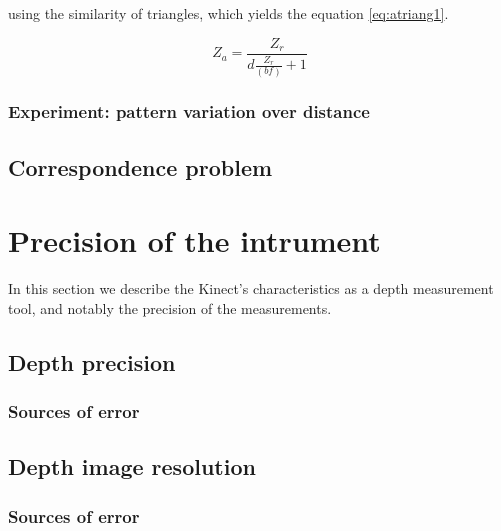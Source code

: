 using the similarity of triangles, which yields the equation \ref{eq:atriang1}.

\begin{equation} \label{eq:atriang1}
    Z_a = \frac{Z_r}{d \frac{Z_r}{(b f)} + 1}
\end{equation}


\subsubsection{Experiment: pattern variation over distance}



\subsection{Correspondence problem}
\label{sub:corr}



\section{Precision of the intrument}
\label{precision}

In this section we describe the Kinect's characteristics as a depth measurement
tool, and notably the precision of the measurements.


\subsection{Depth precision}

\subsubsection{Sources of error}

\subsection{Depth image resolution}

\subsubsection{Sources of error}
